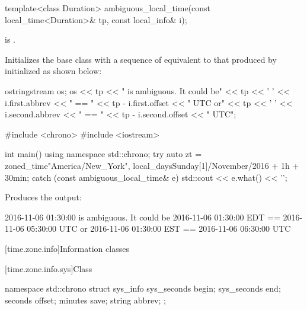 %
\begin{itemdecl}
template<class Duration>
  ambiguous_local_time(const local_time<Duration>& tp, const local_info& i);
\end{itemdecl}

\begin{itemdescr}
\pnum
\expects
{} is .

\pnum
\effects
Initializes the base class with a sequence of 
equivalent to that produced by 
initialized as shown below:

\begin{codeblock}
ostringstream os;
os << tp << " is ambiguous.  It could be\n"
   << tp << ' ' << i.first.abbrev << " == "
   << tp - i.first.offset << " UTC or\n"
   << tp << ' ' << i.second.abbrev  << " == "
   << tp - i.second.offset  << " UTC";
\end{codeblock}

\pnum
\begin{example}
\begin{codeblock}
#include <chrono>
#include <iostream>

int main() {
  using namespace std::chrono;
  try {
    auto zt = zoned_time{"America/New_York",
                         local_days{Sunday[1]/November/2016} + 1h + 30min};
  } catch (const ambiguous_local_time& e) {
    std::cout << e.what() << '\n';
  }
}
\end{codeblock}

Produces the output:

\begin{outputblock}
2016-11-06 01:30:00 is ambiguous.  It could be
2016-11-06 01:30:00 EDT == 2016-11-06 05:30:00 UTC or
2016-11-06 01:30:00 EST == 2016-11-06 06:30:00 UTC
\end{outputblock}
\end{example}
\end{itemdescr}

[time.zone.info]{Information classes}

[time.zone.info.sys]{Class }

\begin{codeblock}
namespace std::chrono {
  struct sys_info {
    sys_seconds begin;
    sys_seconds end;
    seconds     offset;
    minutes     save;
    string      abbrev;
  };
}
\end{codeblock}

